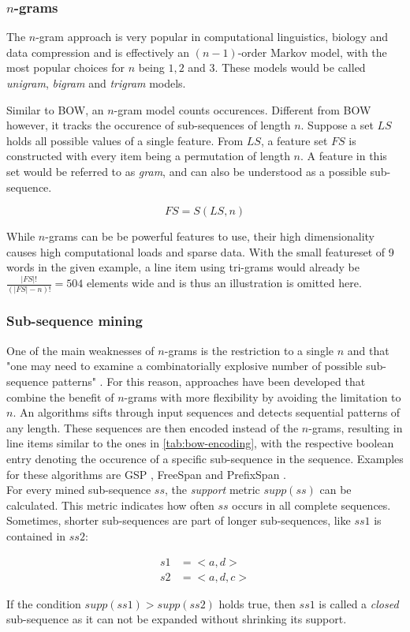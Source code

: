 \subsubsection*{$n$-grams}
The $n$-gram approach is very popular in computational linguistics, biology and data compression and is effectively an $(n-1)$-order Markov model, with the most popular choices for $n$ being $1,2$ and $3$. These models would be called \textit{unigram}, \textit{bigram} and \textit{trigram} models.

Similar to BOW, an $n$-gram model counts occurences. Different from BOW however, it tracks the occurence of sub-sequences of length $n$. Suppose a set $LS$ holds all possible values of a single feature. From $LS$, a feature set $FS$ is constructed with every item being a permutation of length $n$. A feature in this set would be referred to as \textit{gram}, and can also be understood as a possible sub-sequence.

$$
FS = S(LS, n)
$$

While $n$-grams can be be powerful features to use, their high dimensionality causes high computational loads and sparse data. With the small featureset of 9 words in the given example, a line item using tri-grams would already be $\frac{|FS|!}{(|FS|-n)!}=504$ elements wide and is thus an illustration is omitted here.

\subsubsection*{Sub-sequence mining}
One of the main weaknesses of $n$-grams is the restriction to a single $n$ and that "one may need to examine a combinatorially explosive
number of possible sub-sequence patterns" \cite{pei2001prefixspan}. For this reason, approaches have been developed that combine the benefit of $n$-grams with more flexibility by avoiding the limitation to $n$. An algorithms sifts through input sequences and detects sequential patterns of any length. These sequences are then encoded instead of the $n$-grams, resulting in line items similar to the ones in \autoref{tab:bow-encoding}, with the respective boolean entry denoting the occurence of a specific sub-sequence in the sequence. Examples for these algorithms are GSP \cite{srikant1996gsp}, FreeSpan \cite{han2000freespan} and PrefixSpan \cite{pei2001prefixspan}.\\

For every mined sub-sequence $ss$, the \textit{support} metric $supp(ss)$ can be calculated. This metric indicates how often $ss$ occurs in all complete sequences. Sometimes, shorter sub-sequences are part of longer sub-sequences, like $ss1$ is contained in $ss2$:

\begin{equation*}
\begin{split}
s1 &= <a,d>\\
s2 &= <a,d,c>
\end{split}
\end{equation*}

If the condition $supp(ss1)>supp(ss2)$ holds true, then $ss1$ is called a \textit{closed} sub-sequence as it can not be expanded without shrinking its support.
